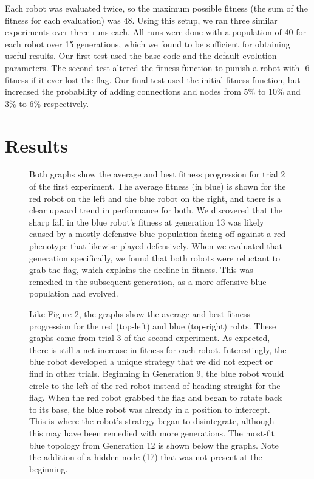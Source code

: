 \documentclass[11pt]{article}
\begin{document}
Each robot was evaluated twice, so the maximum possible fitness (the sum of the fitness for each evaluation) was 48. Using this setup, we ran three similar experiments over three runs each. All runs were done with a population of 40 for each robot over 15 generations, which we found to be sufficient for obtaining useful results. Our first test used the base code and the default evolution parameters. The second test altered the fitness function to punish a robot with -6 fitness if it ever lost the flag. Our final test used the initial fitness function, but increased the probability of adding connections and nodes from 5\% to 10\% and 3\% to 6\% respectively.

\section{Results}

\begin{figure}[h]
\begin{center}
\end{center}
\caption{Both graphs show the average and best fitness progression for trial 2 of the first experiment. The average fitness (in blue) is shown for the red robot on the left and the blue robot on the right, and there is a clear upward trend in performance for both. We discovered that the sharp fall in the blue robot's fitness at generation 13 was likely caused by a mostly defensive blue population facing off against a red phenotype that likewise played defensively. When we evaluated that generation specifically, we found that both robots were reluctant to grab the flag, which explains the decline in fitness. This was remedied in the subsequent generation, as a more offensive blue population had evolved.}
\label{experiment1fitness}
\end{figure}

\begin{figure}[h]
\begin{center}
\end{center}
\caption{Like Figure 2, the graphs show the average and best fitness progression for the red (top-left) and blue (top-right) robts. These graphs came from trial 3 of the second experiment. As expected, there is still a net increase in fitness for each robot. Interestingly, the blue robot developed a unique strategy that we did not expect or find in other trials. Beginning in Generation 9, the blue robot would circle to the left of the red robot instead of heading straight for the flag. When the red robot grabbed the flag and began to rotate back to its base, the blue robot was already in a position to intercept. This is where the robot's strategy began to disintegrate, although this may have been remedied with more generations. The most-fit blue topology from Generation 12 is shown below the graphs. Note the addition of a hidden node (17) that was not present at the beginning.}
\label{experiment1fitness}
\end{figure}
\end{document}
